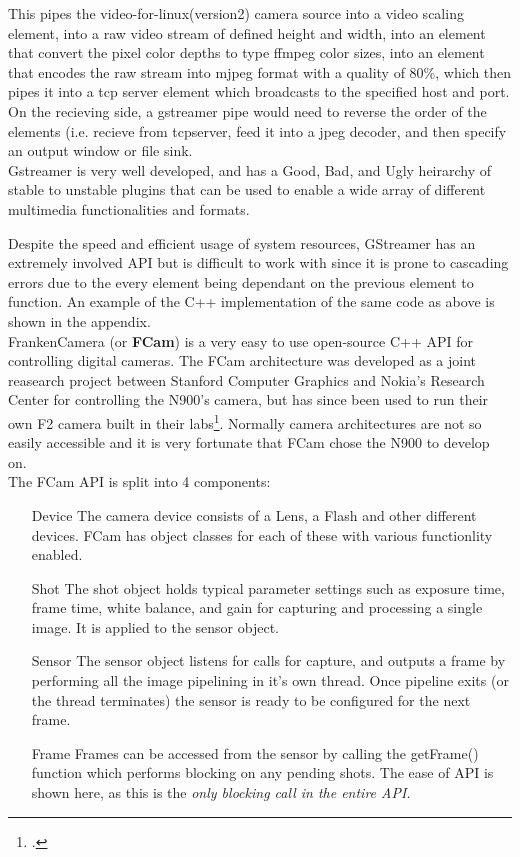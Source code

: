 This pipes the video-for-linux(version2) camera source into a video scaling element, into a raw video stream of defined height and width, into an element that convert the pixel color depths to type ffmpeg color sizes, into an element that encodes the raw stream into mjpeg format with a quality of 80\%, which then pipes it into a tcp server element which broadcasts to the specified host and port.
\\On the recieving side, a gstreamer pipe would need to reverse the order of the elements (i.e. recieve from tcpserver, feed it into a jpeg decoder, and then specify an output window or file sink.
\\Gstreamer is very well developed, and has a Good, Bad, and Ugly heirarchy of stable to unstable plugins that can be used to enable a wide array of different multimedia functionalities and formats.

Despite the speed and efficient usage of system resources, GStreamer has an extremely involved API but is difficult to work with since it is prone to cascading errors due to the every element being dependant on the previous element to function. An example of the C++ implementation of the same code as above is shown in the appendix.\\

FrankenCamera (or {\bf FCam}) is a very easy to use open-source C++ API for controlling digital cameras.  The FCam architecture was developed as a joint reasearch project between Stanford Computer Graphics and Nokia's Research Center for controlling the N900's camera, but has since been used to run their own F2 camera built in their labs\footcite{fcamdoc}. Normally camera architectures are not so easily accessible and it is very fortunate that FCam chose the N900 to develop on.
\pagebreak
\\The FCam API is split into 4 components:
\begin{enumerate}
\item[Device]{The camera device consists of a Lens, a Flash and other different devices. FCam has object classes for each of these with various functionlity enabled.}
\item[Shot]{The shot object holds typical parameter settings such as exposure time, frame time, white balance, and gain for capturing and processing a single image. It is applied to the sensor object.}
\item[Sensor]{The sensor object listens for calls for capture, and outputs a frame by performing all the image pipelining in it's own thread. Once pipeline exits (or the thread terminates) the sensor is ready to be configured for the next frame.}
\item[Frame]{Frames can be accessed from the sensor by calling the getFrame() function which performs blocking on any pending shots. The ease of API is shown here, as this is the \it{only} blocking call in the entire API.}
\end{enumerate}


